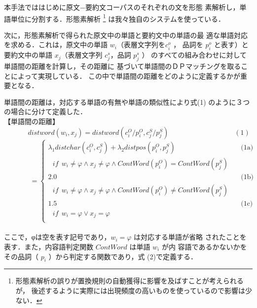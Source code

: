 本手法でははじめに原文−要約文コーパスのそれぞれの文を形態
素解析し，単語単位に分割する．形態素解析
\footnote{
形態素解析の誤りが置換規則の自動獲得に影響を及ばすことが考えられるが，
後述するように実際には出現頻度の高いものを使っているので影響は少ない．
}
は我々独自のシステムを使っている．

次に，形態素解析で得られた原文中の単語と要約文中の単語の最
適な単語対応を求める．これは，原文中の単語 $w_i$（表層文字列を$c^o_i$ ，
品詞を $p^o_i$ と表す）と要約文中の単語 $x_j$（表層文字列 $c^s_j$，品詞 $p^s_j$ ）
のすべての組み合わせに対して単語間の距離を計算し，その距離に
基づいて単語間のＤＰマッチングを取ることによって実現している．
この中で単語間の距離をどのように定義するかが重要となる．

単語間の距離は，対応する単語の有無や単語の類似性により式(1)
のように３つの場合に分けて定義した．\vspace{8mm}\\
【単語間の距離】
$$ \ \ \ \ \ \ \ \ \ \ \ \ \ \ 
distword(w_i, x_j)
  = distword(c^O_i/p^O_i, c^S_j/p^S_j)
\ \ \ \ \ \ \ \ \ \ \ \ \ \ \ \ \ \ \ \ \ \ \ \ \ \ \ \ \ \ \ \ \ \ \ \ \ \ \ \ \ \ \ (1) $$
\[ \ \ \ \ \ \ \ \ \ \ \ \ \ \ \ \ \ = \left\{ \begin{array}{lr}
           \lambda _1{distchar(c^O_i, c^S_j)+\lambda _2distpos(p^O_i, p^S_j)}
             & \mbox{ \ \ \ \ \ \ \ \ \ \ \ (1a)} \\
             \mbox{ \ \ \ $if \ \ w_i \neq φ \wedge x_j \neq φ \wedge ContWord(p^O_i)=ContWord(p^S_j)$}
               & \mbox{} \\
           2.0
             & \mbox{ \ \ \ \ \ \ \ \ \ \ \ (1b)} \\
             \mbox{ \ \ \ $if \ \ w_i \neq φ \wedge x_j \neq φ \wedge ContWord(p^O_i) \neq ContWord(p^S_j)$ }
               & \mbox{} \\
           1.5
             & \mbox{ \ \ \ \ \ \ \ \ \ \ \ (1c)} \\
             \mbox{ \ \ \ $if \ \ w_i = φ \vee x_j = φ$}
               & \mbox{} \\
          \end{array}
  \right. \]
\vspace{8mm}\\
ここで，φは空を表す記号であり，$w_i = φ$ は対応する単語が省略
されたことを表す．また，内容語判定関数 $ContWord$ は単語 $w_i$ が内
容語であるかないかをその品詞（ $p_i$ ）から判定する関数であり，式
(2)で定義する．
\vspace{8mm}\\
